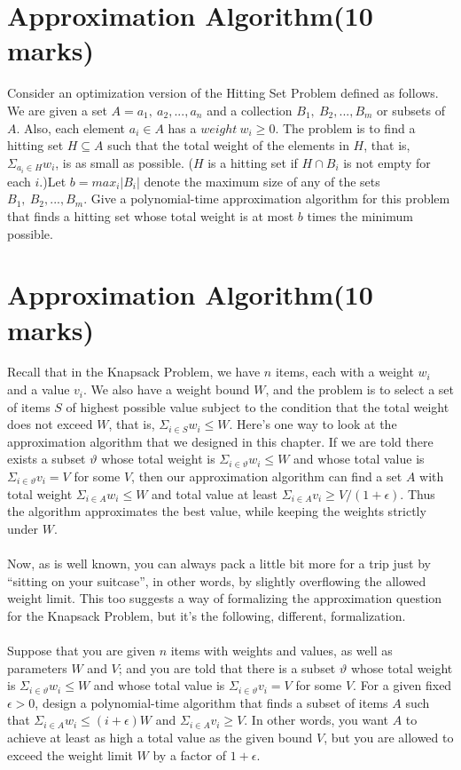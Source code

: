 \documentclass[a4paper,11pt]{article}
\begin{document}
\section{Approximation Algorithm(10 marks)}

Consider an optimization version of the Hitting Set Problem defined as follows. We are given a set $A={a_1,\ a_2,...,a_n}$ and a collection $B_1,\ B_2,...,B_m$ or subsets of $A$. Also, each element $a_i\in A$ has a $weight\ w_i\geq 0$. The problem is to find a hitting set $H\subseteq A$ such that the total weight of the elements in $H$, that is, $\Sigma _{a_i\in H} w_i$, is as small as possible. ($H$ is a hitting set if $H\cap B_i$ is not empty for each $i$.)Let $b=max_i|B_i|$ denote the maximum size of any of the sets $B_1,\ B_2,...,B_m$. Give a polynomial-time approximation algorithm for this problem that finds a hitting set whose total weight is at most $b$ times the minimum possible.

\section{Approximation Algorithm(10 marks)}

Recall that in the Knapsack Problem, we have $n$ items, each with a weight $w_i$ and a value $v_i$. We also have a weight bound $W$, and the problem is to select a set of items $S$ of highest possible value subject to the condition that the total weight does not exceed $W$, that is, $\Sigma _{i\in S}w_i\leq W$. Here's one way to look at the approximation algorithm that we designed in this chapter. If we are told there exists a subset $\vartheta $ whose total weight is $\Sigma _{i\in \vartheta }w_i\leq W$ and whose total value is $\Sigma _{i\in \vartheta}v_i=V$ for some $V$, then our approximation algorithm can find a set $A$ with total weight $\Sigma _{i\in A}w_i\leq W$ and total value at least $\Sigma _{i\in A}v_i\geq V/(1+\epsilon )$. Thus the algorithm approximates the best value, while keeping the weights strictly under $W$.\\\\
Now, as is well known, you can always pack a little bit more for a trip just by ``sitting on your suitcase'', in other words, by slightly overflowing the allowed weight limit. This too suggests a way of formalizing the approximation question for the Knapsack Problem, but it's the following, different, formalization.\\\\
Suppose that you are given $n$ items with weights and values, as well as parameters $W$ and $V$; and you are told that there is a subset $\vartheta$ whose total weight is $\Sigma _{i\in \vartheta}w_i \leq W$ and whose total value is $\Sigma _{i\in \vartheta}v_i=V$ for some $V$. For a given fixed $\epsilon >0$, design a polynomial-time algorithm that finds a subset of items $A$ such that $\Sigma _{i\in A}w_i \leq (i+\epsilon )W $ and $\Sigma _{i\in A}v_i \geq V$. In other words, you want $A$ to achieve at least as high a total value as the given bound $V$, but you are allowed to exceed the weight limit $W$ by a factor of $1+\epsilon $.
\end{document}
